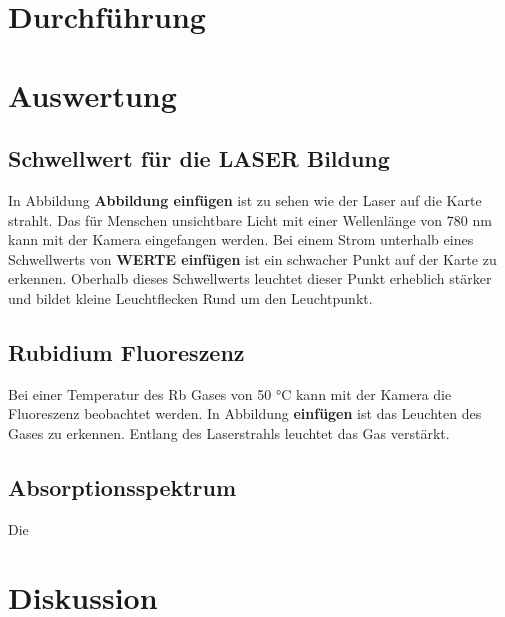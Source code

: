 \section{Durchführung}



\section{Auswertung}

\subsection{Schwellwert für die LASER Bildung}
In Abbildung \textbf{Abbildung einfügen} ist zu sehen wie der Laser auf die Karte strahlt.
Das für Menschen unsichtbare Licht mit einer Wellenlänge von 780 nm kann mit der Kamera eingefangen werden. %
Bei einem Strom unterhalb eines Schwellwerts von \textbf{WERTE einfügen} ist ein schwacher Punkt auf der Karte zu erkennen.
Oberhalb dieses Schwellwerts leuchtet dieser Punkt erheblich stärker und bildet kleine Leuchtflecken Rund um den Leuchtpunkt.

\subsection{Rubidium Fluoreszenz}
Bei einer Temperatur des Rb Gases von 50 °C kann mit der Kamera die Fluoreszenz beobachtet werden.
In Abbildung \textbf{einfügen} ist das Leuchten des Gases zu erkennen.
Entlang des Laserstrahls leuchtet das Gas verstärkt.


\subsection{Absorptionsspektrum}
Die 


\section{Diskussion}


\newpage
\printbibliography


